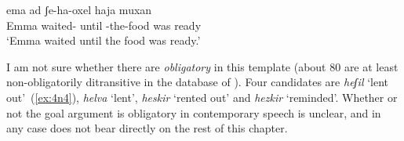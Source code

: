  \begin{exe}
 \ex  \label{ex:4:1}
 \begin{xlist} 
	
	
 \z
 \ex  \label{ex:4:2}
 \begin{xlist} 
	
	 
 \z
\ex  \label{ex:vd:unerg}  
 	{ \gll ema  ad ʃe-ha-oxel haja muxan\\
 	  Emma waited- until -the-food was ready\\
 	\glt `Emma waited until the food was ready.' } 
	
 \z 

I am not sure whether there are \emph{obligatory}  in this template (about 80 are at least non-obligatorily ditransitive in the database of \citealt{ahdout19phd}). Four candidates are \emph{heʃil} `lent out'~(\ref{ex:4n4}), \emph{helva} `lent',  \emph{heskir} `rented out' and \emph{hezkir} `reminded'. Whether or not the goal argument is obligatory in contemporary speech is unclear, and in any case does not bear directly on the rest of this chapter.

 \begin{exe}
 \label{ex:4n4}
		
 \z 
	

\end{exe}
\end{xlist}
\end{xlist}
\end{exe}
